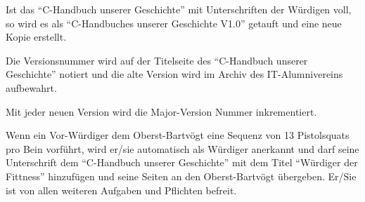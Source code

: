 \documentclass[fontsize=12pt,parskip=half]{scrartcl}
\begin{document}
\begin{contract}
  Ist das ``C-Handbuch unserer Geschichte'' mit Unterschriften der Würdigen voll, so wird es als ``C-Handbuches unserer Geschichte V1.0'' getauft und eine neue Kopie erstellt.

  Die Versionsnummer wird auf der Titelseite des ``C-Handbuch unserer Geschichte'' notiert und die alte Version wird im Archiv des IT-Alumnivereins aufbewahrt.

  Mit jeder neuen Version wird die Major-Version Nummer inkrementiert.

  \Clause[title={Fittnessklausel}]
  Wenn ein Vor-Würdiger dem Oberst-Bartvögt eine Sequenz von 13 Pistolsquats pro Bein vorführt, wird er/sie automatisch als Würdiger anerkannt und darf seine Unterschrift
  dem ``C-Handbuch unserer Geschichte'' mit dem Titel ``Würdiger der Fittness'' hinzufügen und seine Seiten an den Oberst-Bartvögt übergeben. Er/Sie ist von allen weiteren
  Aufgaben und Pflichten befreit.

\end{contract}

\pagebreak
\end{document}
